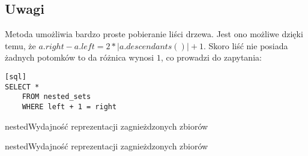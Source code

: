 

\subsection{Uwagi}

Metoda umożliwia bardzo proste pobieranie liści drzewa. 
Jest ono możliwe dzięki temu, że $a.right - a.left = 2 * |a.descendants()| + 1$. 
Skoro liść nie posiada żadnych potomków to da różnica wynosi $1$, co prowadzi do zapytania: 
\begin{verbatim}[sql]
SELECT *
    FROM nested_sets
    WHERE left + 1 = right
\end{verbatim}



\begin{qxtab}{nested}{Wydajność reprezentacji zagnieżdzonych zbiorów}
\end{qxtab}

\begin{qxfig}{nested}{Wydajność reprezentacji zagnieżdzonych zbiorów}
\end{qxfig}

